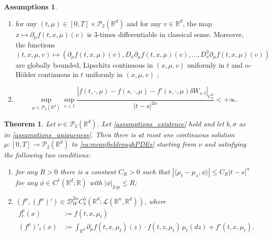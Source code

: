 \documentclass[10pt, a4paper]{article} %
\newcommand{\R}{\mathbb{R}}
\theoremstyle{definition}
\newtheorem{assumptions}[defn]{Assumptions}
\theoremstyle{plain}
\newtheorem{thm}[defn]{Theorem}
\begin{document}
\begin{assumptions}
\begin{enumerate}
        \item for any $(t,\mu) \in [0, T] \times \mathcal{P}_2 (\mathbb{R}^d)$ and for any $v \in \mathbb{R}^d$, the map $x \mapsto \partial_{\mu} f (t, x, \mu) (v)$ is 3-times differentiable in classical sense. Moreover, the functions \[ (t, x, \mu, v) \mapsto (\partial_{\mu} f (t, x, \mu) (v), D_x \partial_{\mu} f (t, x, \mu) (v), \ldots, D^3_x \partial_{\mu} f (t, x, \mu) (v)) \] are globally bounded, Lipschitz continuous in $(x, \mu, v)$ uniformly in $t$ and $\alpha$-H\"older continuous in $t$ uniformly in $(x, \mu, v)$ ;
  
        \item \[ \sup_{\mu \in \mathcal{P}_2 (\mathbb{R}^d)} \sup_{s < t} \frac{| f (t, \cdot, \mu) - f (s, \cdot, \mu) - f' (s, \cdot, \mu) \delta W_{s, t} |_{C^3_b}}{| t - s |^{2 \alpha}} < + \infty . \]
        
\end{enumerate}
\end{assumptions}


\begin{thm} \label{thm:uniqueness_meanfieldroughPDEs}
    Let $\nu \in \mathcal{P}_2(\R^d)$. Let \cref{assumptions_existence} hold and let $b,\sigma$ as in \cref{assumptions_uniqueness}. 
    Then there is at most one continuous solution $\mu :[0,T] \to \mathcal{P}_2(\R^d)$ to \eqref{eq:meanfieldroughPDEs} starting from $\nu$ and satisfying the following two conditions: 
    \begin{enumerate}
        \item for any $R>0$ there is a constant $C_R >0$ such that $|\langle \mu_t - \mu_s, \phi\rangle| \le C_R |t-s|^\alpha$ for any $\phi \in C^1(\R^d;\R)$ with $|\phi|_{Lip} \le R$; 
        \item %
        $(f^\mu,(f^\mu)') \in \mathscr{D}_W^{2\alpha} C_b^5(\R^d;\mathscr{L}(\R^n,\R^d))$,
        where 
        \begin{align*}
            f^\mu_t(x) &:= f(t, x,\mu_t) \\
            (f^\mu)'_t(x) &:= \int_{\R^d} \partial_\mu f (t, x,\mu_t) (z) \cdot f(t, z,\mu_t) \, \mu_t(dz) + f'(t, x,\mu_t).
        \end{align*}
    \end{enumerate} 
\end{thm}
\end{document}
